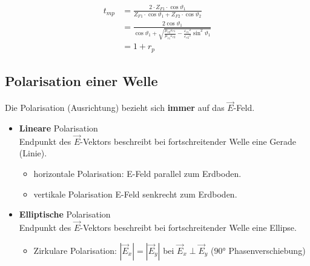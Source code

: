 \begin{equation*}
\begin{aligned}
		t_{mp} & = \frac{2 \cdot  Z_{F1}\cdot \cos \vartheta_1}{Z_{F1} \cdot \cos \vartheta_1+Z_{F2} \cdot \cos \vartheta_2}                                                                                                                                                                                                                                  \\
		       & =\frac{2 \cos \vartheta_1}{\cos \vartheta_1+\sqrt{\frac{\mu_{r 2} \varepsilon_{r 1}}{\mu_{r 1} \varepsilon_{r 2}}-\frac{\varepsilon_{r 1}{ }^2}{\varepsilon_{r 2}{ }^2} \sin ^2 \vartheta_1}}                                                                                                                                                \\
		       & = 1+r_p
	\end{aligned}
\end{equation*}

\subsection{Polarisation einer Welle}
Die Polarisation (Ausrichtung) bezieht sich \textbf{immer} auf das $\vec{E}$-Feld.
\begin{itemize}
	\item \textbf{Lineare} Polarisation\\
	      Endpunkt des $\vec{E}$-Vektors beschreibt bei fortschreitender Welle eine Gerade (Linie).
	      \begin{itemize}
		      \item horizontale Polarisation: E-Feld parallel zum Erdboden.
		      \item vertikale Polarisation E-Feld senkrecht zum Erdboden.
	      \end{itemize}
	\item \textbf{Elliptische} Polarisation\\
	      Endpunkt des $\vec{E}$-Vektors beschreibt bei fortschreitender Welle eine Ellipse.
	      \begin{itemize}
		      \item Zirkulare Polarisation: $|\vec{E}_x| = |\vec{E}_y|$ bei $ \vec{E}_x \perp \vec{E}_y $ ($ \ang{90}$ Phasenverschiebung)
	      \end{itemize}
\end{itemize}
